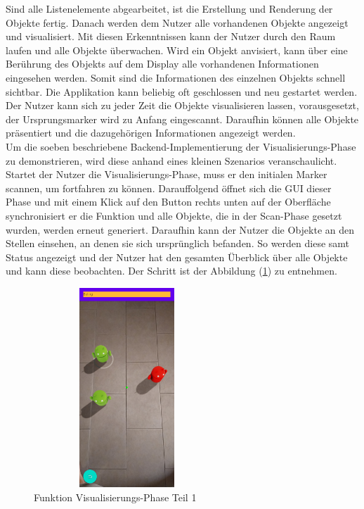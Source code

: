 Sind alle Listenelemente abgearbeitet, ist die Erstellung und Renderung der Objekte fertig. Danach werden dem Nutzer alle vorhandenen Objekte angezeigt und 
visualisiert. Mit diesen Erkenntnissen kann der Nutzer durch den Raum laufen und alle Objekte überwachen. Wird ein Objekt anvisiert, kann über eine Berührung 
des Objekts auf dem Display alle vorhandenen Informationen eingesehen werden. Somit sind die Informationen des einzelnen Objekts schnell sichtbar.  
Die Applikation kann beliebig oft geschlossen und neu gestartet werden. Der Nutzer kann sich zu jeder Zeit die Objekte visualisieren lassen, vorausgesetzt, der 
Ursprungsmarker wird zu Anfang eingescannt. Daraufhin können alle Objekte präsentiert und die dazugehörigen Informationen angezeigt werden. %
\\ 
\linebreak
Um die soeben beschriebene Backend-Implementierung der Visualisierungs-Phase zu demonstrieren, wird diese anhand eines kleinen Szenarios veranschaulicht. 
\\ 
Startet der Nutzer die Visualisierungs-Phase, muss er den initialen Marker scannen, um fortfahren zu können. Darauffolgend öffnet sich die \acs{GUI} dieser 
Phase und mit einem Klick auf den Button rechts unten auf der Oberfläche synchronisiert er die Funktion und alle Objekte, die in der Scan-Phase gesetzt wurden, 
werden erneut generiert. Daraufhin kann der Nutzer die Objekte an den Stellen einsehen, an denen sie sich ursprünglich befanden. So werden diese samt Status 
angezeigt und der Nutzer hat den gesamten Überblick über alle Objekte und kann diese beobachten. Der Schritt ist der Abbildung (\ref{pic:visual_objects}) 
zu entnehmen. 
\begin{figure}[hbt!]
    \centering
    \includegraphics[width=7cm,height=7.5cm,keepaspectratio]{4Umsetzung/Bilder/show_objects_after_loading.jpg}
    \caption{Funktion Visualisierungs-Phase Teil 1}
    \label{pic:visual_objects}
\end{figure}

